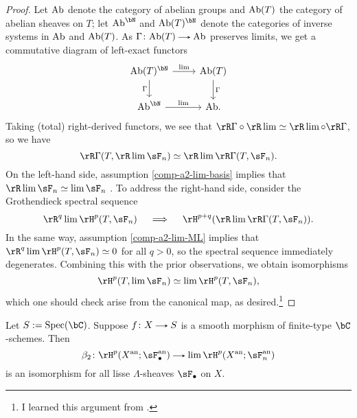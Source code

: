 \begin{nothing}
\begin{sublemma}
    \begin{proof}
      Let $\mathrm{Ab}$ denote the category of abelian groups and $\mathrm{Ab}(T)$ the category of abelian sheaves on $T$; let $\Ab^\bN$ and $\Ab(T)^\bN$ denote the categories of inverse systems in $\mathrm{Ab}$ and $\mathrm{Ab}(T)$. As $\Gamma \c \Ab(T) \to \Ab$ preserves limits, we get a commutative diagram of left-exact functors
      \[
        \begin{tikzcd}
          \Ab(T)^\bN \ar[r, "\lim"] \ar[d, "\Gamma", swap] &
          \Ab(T) \ar[d, "\Gamma"] \\
          \Ab^\bN \ar[r, "\lim"] &
          \Ab.
        \end{tikzcd}
      \]
      Taking (total) right-derived functors, we see that $\rR\Gamma \circ \rR\lim \iso \rR\lim \circ \rR\Gamma$, so we have
      \[
        \rR\Gamma(T, \rR\lim \sF_n) \iso \rR\lim \rR\Gamma(T, \sF_n).
      \]
      On the left-hand side, assumption \cref{comp-a2-lim-basis} implies that $\rR \lim \sF_n \iso \lim \sF_n$ \cite[Tag 0BKS]{stacks-project}. To address the right-hand side, consider the Grothendieck spectral sequence
      \[
        \rR^q \lim \rH^p(T, \sF_n)
        \quad \implies \quad
        \rH^{p+q}(\rR\lim \rR\Gamma(T, \sF_n)).
      \]
      In the same way, assumption \cref{comp-a2-lim-ML} implies that $\rR^q \lim \rH^p(T, \sF_n) \iso 0$ for all $q > 0$, so the spectral sequence immediately degenerates. Combining this with the prior observations, we obtain isomorphisms
      \[
        \rH^p(T, \lim \sF_n) \iso \lim \rH^p(T, \sF_n),
      \]
      which one should check arise from the canonical map, as desired.\footnote{I learned this argument from \cite{bhatt-cohomology-limit}.}
    \end{proof}
  \end{sublemma}

  \begin{sublemma}
    \label{comp-a2-smooth}
    Let $S \ce \Spec(\bC)$. Suppose $f \c X \to S$ is a smooth morphism of finite-type $\bC$-schemes. Then
    \[
      \beta_2 \c \rH^p(X^\an; \sF_\bullet^\an) \to \lim \rH^p(X^\an; \sF_n^\an)
    \]
    is an isomorphism for all lisse $\Lambda$-sheaves $\sF_\bullet$ on $X$.


\end{sublemma}
\end{nothing}
